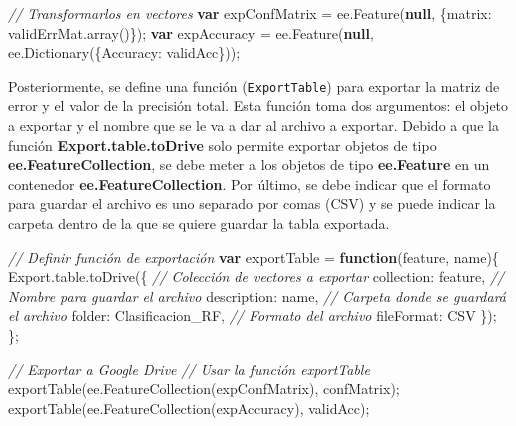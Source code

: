 \documentclass[
  12pt,
  letterpaper,
  twoside]{book}
\newenvironment{Shaded}{\begin{snugshade}}{\end{snugshade}}
\newcommand{\AttributeTok}[1]{\textcolor[rgb]{0.48,0.12,0.64}{#1}}
\newcommand{\CommentTok}[1]{\textcolor[rgb]{0.24,0.58,0.00}{\textit{#1}}}
\newcommand{\DataTypeTok}[1]{\textcolor[rgb]{0.00,0.00,0.00}{#1}}
\newcommand{\FunctionTok}[1]{\textcolor[rgb]{0.48,0.12,0.64}{#1}}
\newcommand{\KeywordTok}[1]{\textcolor[rgb]{0.00,0.00,0.00}{\textbf{#1}}}
\newcommand{\NormalTok}[1]{#1}
\newcommand{\OperatorTok}[1]{\textcolor[rgb]{0.00,0.00,0.00}{#1}}
\newcommand{\StringTok}[1]{\textcolor[rgb]{0.87,0.29,0.22}{#1}}
\newcommand\boldpurple[1]{\textcolor{darkpurple}{\textbf{#1}}}
\begin{document}
\begin{Shaded}
\begin{Highlighting}[]
\CommentTok{// Transformarlos en vectores}
\KeywordTok{var}\NormalTok{ expConfMatrix }\OperatorTok{=}\NormalTok{  ee}\OperatorTok{.}\FunctionTok{Feature}\NormalTok{(}\KeywordTok{null}\OperatorTok{,}\NormalTok{ \{}\DataTypeTok{matrix}\OperatorTok{:}\NormalTok{ validErrMat}\OperatorTok{.}\FunctionTok{array}\NormalTok{()\})}\OperatorTok{;}
\KeywordTok{var}\NormalTok{ expAccuracy }\OperatorTok{=}\NormalTok{ ee}\OperatorTok{.}\FunctionTok{Feature}\NormalTok{(}\KeywordTok{null}\OperatorTok{,}\NormalTok{ ee}\OperatorTok{.}\FunctionTok{Dictionary}\NormalTok{(\{}\DataTypeTok{Accuracy}\OperatorTok{:}\NormalTok{ validAcc\}))}\OperatorTok{;}
\end{Highlighting}
\end{Shaded}

Posteriormente, se define una función (\texttt{ExportTable}) para exportar la matriz de error y el valor de la precisión total. Esta función toma dos argumentos: el objeto a exportar y el nombre que se le va a dar al archivo a exportar. Debido a que la función \boldpurple{Export.table.toDrive} solo permite exportar objetos de tipo \boldpurple{ee.FeatureCollection}, se debe meter a los objetos de tipo \boldpurple{ee.Feature} en un contenedor \boldpurple{ee.FeatureCollection}. Por último, se debe indicar que el formato para guardar el archivo es uno separado por comas (CSV) y se puede indicar la carpeta dentro de la que se quiere guardar la tabla exportada.

\begin{Shaded}
\begin{Highlighting}[]
\CommentTok{// Definir función de exportación}
\KeywordTok{var}\NormalTok{ exportTable }\OperatorTok{=} \KeywordTok{function}\NormalTok{(feature}\OperatorTok{,}\NormalTok{ name)\{}
\NormalTok{  Export}\OperatorTok{.}\AttributeTok{table}\OperatorTok{.}\FunctionTok{toDrive}\NormalTok{(\{}
    \CommentTok{// Colección de vectores a exportar}
    \DataTypeTok{collection}\OperatorTok{:}\NormalTok{ feature}\OperatorTok{,}
    \CommentTok{// Nombre para guardar el archivo}
    \DataTypeTok{description}\OperatorTok{:}\NormalTok{ name}\OperatorTok{,}
    \CommentTok{// Carpeta donde se guardará el archivo}
    \DataTypeTok{folder}\OperatorTok{:} \StringTok{\textquotesingle{}Clasificacion\_RF\textquotesingle{}}\OperatorTok{,}
    \CommentTok{// Formato del archivo}
    \DataTypeTok{fileFormat}\OperatorTok{:} \StringTok{\textquotesingle{}CSV\textquotesingle{}}
\NormalTok{ \})}\OperatorTok{;}
\NormalTok{\}}\OperatorTok{;}

\CommentTok{// Exportar a Google Drive}
\CommentTok{// Usar la función exportTable}
\FunctionTok{exportTable}\NormalTok{(ee}\OperatorTok{.}\FunctionTok{FeatureCollection}\NormalTok{(expConfMatrix)}\OperatorTok{,} \StringTok{\textquotesingle{}confMatrix\textquotesingle{}}\NormalTok{)}\OperatorTok{;}
\FunctionTok{exportTable}\NormalTok{(ee}\OperatorTok{.}\FunctionTok{FeatureCollection}\NormalTok{(expAccuracy)}\OperatorTok{,} \StringTok{\textquotesingle{}validAcc\textquotesingle{}}\NormalTok{)}\OperatorTok{;}
\end{Highlighting}
\end{Shaded}
\end{document}
